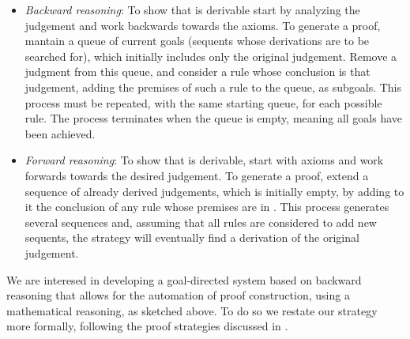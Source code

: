 \documentclass[a4paper,UKenglish]{lipics}
\begin{document}
\begin{itemize}
\item {\em Backward reasoning}: To show that  is derivable start by analyzing the judgement and work backwards towards the axioms. To generate a proof, mantain a queue of current goals (sequents whose derivations are to be searched for), which initially includes only the original judgement. Remove a judgment from this queue, and consider a rule whose conclusion is that judgement, adding the premises of such a rule to the queue, as subgoals. This process must be repeated, with the same starting queue, for each possible rule.  The process terminates when the queue is empty, meaning all goals have been achieved.
\item {\em Forward reasoning}: To show that  is derivable, start with axioms and work forwards towards the desired judgement. To generate a proof, extend a sequence  of already derived judgements, which is initially empty, by adding to it the conclusion of any rule whose premises are in .  This process generates several sequences and, assuming that all rules are considered to add new sequents, the strategy will eventually find a derivation of the original judgement. 
\end{itemize}

\noindent We are interesed in developing a goal-directed system based on backward reasoning that allows for the automation of proof construction, using a mathematical reasoning, as sketched above. To do so we restate our strategy more formally, following the proof strategies discussed in \cite{mh}.
\end{document}
